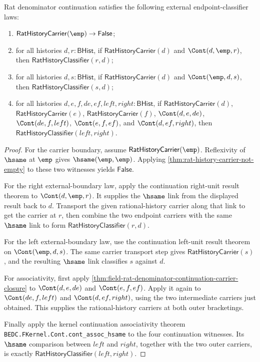 \begin{theorem}
\label{thm:field-rat-denominator-continuation-external-boundary-laws}
Rat denominator continuation satisfies the following external
endpoint-classifier laws:
\begin{enumerate}
  \item $\mathsf{RatHistoryCarrier}(\emp)\to\mathsf{False}$;
  \item for all histories $d,r:\mathsf{BHist}$, if
  $\mathsf{RatHistoryCarrier}(d)$ and $\Cont(d,\emp,r)$, then
  $\mathsf{RatHistoryClassifier}(r,d)$;
  \item for all histories $d,s:\mathsf{BHist}$, if
  $\mathsf{RatHistoryCarrier}(d)$ and $\Cont(\emp,d,s)$, then
  $\mathsf{RatHistoryClassifier}(s,d)$;
  \item for all histories $d,e,f,de,ef,left,right:\mathsf{BHist}$, if
  $\mathsf{RatHistoryCarrier}(d)$, $\mathsf{RatHistoryCarrier}(e)$,
  $\mathsf{RatHistoryCarrier}(f)$, $\Cont(d,e,de)$, $\Cont(de,f,left)$,
  $\Cont(e,f,ef)$, and $\Cont(d,ef,right)$, then
  $\mathsf{RatHistoryClassifier}(left,right)$.
\end{enumerate}
\end{theorem}
\begin{proof}
For the carrier boundary, assume $\mathsf{RatHistoryCarrier}(\emp)$.
Reflexivity of $\hsame$ at $\emp$ gives $\hsame(\emp,\emp)$. Applying
\autoref{thm:rat-history-carrier-not-empty} to these two witnesses yields
$\mathsf{False}$.

For the right external-boundary law, apply the continuation right-unit result
theorem to $\Cont(d,\emp,r)$. It supplies the $\hsame$ link from the displayed
result back to $d$. Transport the given rational-history carrier along that
link to get the carrier at $r$, then combine the two endpoint carriers with the
same $\hsame$ link to form $\mathsf{RatHistoryClassifier}(r,d)$.

For the left external-boundary law, use the continuation left-unit result theorem
on $\Cont(\emp,d,s)$. The same carrier transport step gives
$\mathsf{RatHistoryCarrier}(s)$, and the resulting $\hsame$ link classifies
$s$ against $d$.

For associativity, first apply
\autoref{thm:field-rat-denominator-continuation-carrier-closure} to
$\Cont(d,e,de)$ and $\Cont(e,f,ef)$. Apply it again to
$\Cont(de,f,left)$ and $\Cont(d,ef,right)$, using the two intermediate
carriers just obtained. This supplies the rational-history carriers at both
outer bracketings.

Finally apply the kernel continuation associativity theorem
\texttt{BEDC.FKernel.Cont.cont\_assoc\_hsame} to the four continuation
witnesses. Its $\hsame$ comparison between $left$ and $right$, together with
the two outer carriers, is exactly
$\mathsf{RatHistoryClassifier}(left,right)$.
\end{proof}

